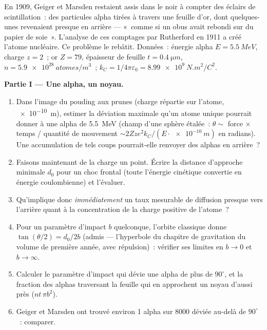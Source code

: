\begin{problem}\label{pb:b3:scattering-theory:1}
En 1909, Geiger et Marsden restaient assis dans le noir à compter des
éclairs de scintillation~: des particules alpha tirées à travers une
feuille d'or, dont quelques-unes revenaient presque en arrière ---
«~comme si un obus avait rebondi sur du papier de soie~». L'analyse de
ces comptages par Rutherford en 1911 a créé l'atome nucléaire. Ce
problème le rebâtit. Données~: énergie alpha $E =
\qty{5.5}{MeV}$, charge $z = 2$~; or $Z = 79$, épaisseur de feuille $t
= \qty{0.4}{\micro m}$, $n = \qty{5.9e28}{atomes/m^3}$~; $k_C =
1/4\pi\varepsilon_0 = \qty{8.99e9}{N.m^2/C^2}$.

\medskip\noindent\textbf{Partie I --- Une alpha, un noyau.}
\begin{enumerate}
  \item Dans l'image du pouding aux prunes (charge répartie sur
        l'atome, \qty{e-10}{m}), estimer la déviation maximale qu'un
        atome unique pourrait donner à une alpha de \qty{5.5}{MeV}
        (champ d'une sphère étalée~: $\theta \sim$ force $\times$
        temps / quantité de mouvement
        $\sim 2Zze^2k_C/(E\cdot\qty{e-10}{m})$ en radians). Une
        accumulation de tels coups pourrait-elle renvoyer des alphas
        en arrière~?
  \item Faisons maintenant de la charge un point. Écrire la distance
        d'approche minimale $d_0$ pour un choc frontal (toute
        l'énergie cinétique convertie en énergie coulombienne) et
        l'évaluer.
  \item Qu'implique donc \emph{immédiatement} un taux mesurable de
        diffusion presque vers l'arrière quant à la concentration de
        la charge positive de l'atome~?
  \item Pour un paramètre d'impact $b$ quelconque, l'orbite classique
        donne $\tan(\theta/2) = d_0/2b$ (admis --- l'hyperbole du
        chapitre de gravitation du volume de première année, avec
        répulsion)~: vérifier ses limites en $b \to 0$ et $b \to
        \infty$.
  \item Calculer le paramètre d'impact qui dévie une alpha de plus de
        $90^\circ$, et la fraction des alphas traversant la feuille
        qui en approchent un noyau d'aussi près ($n t\,\pi
        b^2$).
  \item Geiger et Marsden ont trouvé environ 1 alpha sur 8000 déviée
        au-delà de $90^\circ$~: comparer.
\end{enumerate}


\end{problem}
